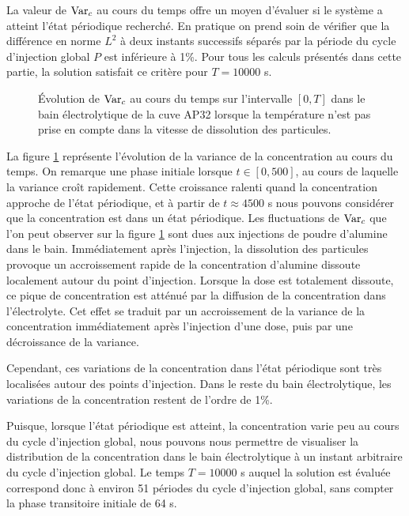 La valeur de $\operatorname{Var}_c$ au cours du temps offre un moyen
d'évaluer si le système a atteint l'état périodique
recherché. En pratique on prend soin de
vérifier que la différence en norme $L^2$ à deux instants successifs
séparés par la période du cycle d'injection global $P$ est inférieure
à \num{1}\%. Pour tous les calculs présentés dans cette partie, la
solution satisfait ce critère pour $T = \num{10000}$ \si{\second}.

\begin{figure}
  \begin{center}
    
    \caption{Évolution de $\operatorname{Var}_c$ au cours du temps sur
      l'intervalle $[0, T]$ dans le bain électrolytique de la cuve
      AP32 lorsque la température n'est pas prise en compte dans la
      vitesse de dissolution des particules.}
    \label{fig:alumin-control-var}
  \end{center}
\end{figure}

La figure \ref{fig:alumin-control-var} représente l'évolution de
la variance de la concentration au cours du temps. On remarque une
phase initiale lorsque $t\in[0,500]$, au cours de laquelle la variance
croît rapidement. Cette croissance ralenti quand la concentration
approche de l'état périodique, et à partir de $t \approx
\num{4500}$ \si{\second} nous pouvons considérer que la
concentration est dans un état périodique. Les
fluctuations de $\operatorname{Var}_c$ que l'on peut observer sur la
figure \ref{fig:alumin-control-var} sont dues aux injections de poudre
d'alumine dans le bain. Immédiatement après l'injection, la
dissolution des particules provoque un accroissement rapide de la
concentration d'alumine dissoute localement autour du point
d'injection. Lorsque la dose est totalement dissoute, ce pique de
concentration est atténué par la diffusion de la concentration
dans l'électrolyte. Cet effet se traduit par un accroissement de la
variance de la concentration immédiatement après l'injection d'une
dose, puis par une décroissance de la variance.

Cependant, ces variations de la concentration dans l'état
périodique sont très localisées autour des points d'injection. Dans
le reste du bain électrolytique, les variations de la concentration
restent de l'ordre de \num{1}\%.

Puisque, lorsque l'état périodique est atteint, la
concentration varie peu au cours du cycle d'injection global, nous
pouvons nous permettre de visualiser la distribution de la
concentration dans le bain électrolytique à un instant arbitraire du
cycle d'injection global. Le temps $T = \num{10000}$ \si{\second}
auquel la solution est évaluée correspond donc à environ \num{51}
périodes du cycle d'injection global, sans compter la phase
transitoire initiale de \num{64} \si{\second}.

